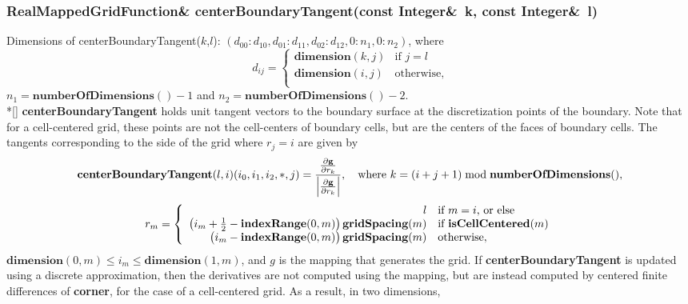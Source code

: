 \documentclass{article}
\begin{document}
  \subsubsection{RealMappedGridFunction\& centerBoundaryTangent(const Integer\&~k, const Integer\&~l)}
  \label{MappedGrid::centerBoundaryTangent(k,l)}
    Dimensions of centerBoundaryTangent($k$,$l$): $(d_{00}\colon d_{10},d_{01}\colon d_{11},d_{02}\colon d_{12},0\colon n_1,0\colon n_2)$,
    where \[d_{ij} = \left\{ \begin{array}{ll}
      \textbf{dimension}(k,j) & \mbox{if $j=l$}   \\
      \textbf{dimension}(i,j) & \mbox{otherwise,} \\
    \end{array} \right. \]
    $n_1 = \textbf{numberOfDimensions}() - 1$
    and $n_2 = \textbf{numberOfDimensions}() - 2$. \\*[\parskip]
    \textbf{centerBoundaryTangent} holds unit tangent vectors to the boundary surface at the discretization points of the boundary.
    Note that for a cell-centered grid, these points are not the cell-centers of boundary cells, but are the centers of the faces
    of boundary cells.  The tangents corresponding to the side of the grid where $r_j=i$ are given by
    \[
      \textbf{centerBoundaryTangent}(l,i)(i_0,i_1,i_2,\ast,j) =
      {{\partial \textbf{g} \over \partial r_k} \over
      \Big|{\partial \textbf{g} \over \partial r_k} \Big|},
      \quad\mbox{where $k=(i+j+1)\bmod{\bf{}numberOfDimensions}()$},
    \]
    \[
      r_m = \left\{ \begin{array}{rl}
        l                                                                                   & \mbox{if $m=i$, or else}         \\
        \big(i_m + {1\over2} - \textbf{indexRange}(0,m)\big)\,\textbf{gridSpacing}(m) & \mbox{if \bf{}isCellCentered}(m) \\
        \big(i_m             - \textbf{indexRange}(0,m)\big)\,\textbf{gridSpacing}(m) & \mbox{otherwise},                \\
      \end{array} \right.
    \]
    $\textbf{dimension}(0,m) \le i_m \le \textbf{dimension}(1,m)$, and {\boldmath $g$} is the mapping that generates the grid.
    If \textbf{centerBoundaryTangent} is updated using a discrete approximation, then the derivatives are not computed using the mapping, but are
    instead computed by centered finite differences of \textbf{corner}, for the case of a cell-centered grid.  As a result, in two dimensions,
\end{document}
